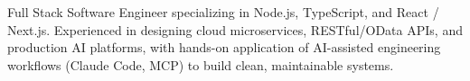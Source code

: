 \begin{onecolentry}
    Full Stack Software Engineer specializing in Node.js, TypeScript, and React / Next.js. Experienced in designing cloud microservices, RESTful/OData APIs, and production AI platforms, with hands-on application of AI-assisted engineering workflows (Claude Code, MCP) to build clean, maintainable systems.
\end{onecolentry}
